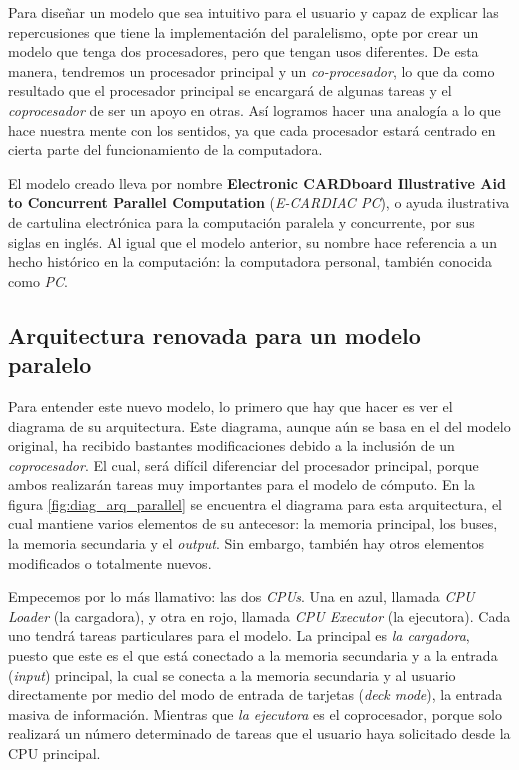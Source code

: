 \documentclass[letterpaper,12pt,oneside]{book}
\begin{document}
	 Para diseñar un modelo que sea intuitivo para el usuario y capaz de explicar las repercusiones que tiene
	 la implementación del paralelismo, opte por crear un modelo que tenga dos procesadores, pero que tengan
	 usos diferentes. De esta manera, tendremos un procesador principal y un \textit{co-procesador}, lo
	 que da como resultado que el procesador principal
	 se encargará de algunas tareas y el \textit{coprocesador} de ser un apoyo en otras. Así logramos
	 hacer una analogía a lo que hace nuestra mente con los sentidos, ya que cada procesador
	 estará centrado en cierta parte del funcionamiento de la computadora.
	 


	 El modelo creado lleva por nombre \textbf{Electronic CARDboard Illustrative Aid to
	 Concurrent Parallel Computation} (\textit{E-CARDIAC PC}), o ayuda ilustrativa de cartulina electrónica para la computación paralela y concurrente, 
	 por
	 sus siglas en inglés. Al igual que el modelo anterior, su nombre hace referencia a un hecho histórico en la computación: la computadora
	 personal, también conocida como \textit{PC}.
	 
	 	\subsection{Arquitectura renovada para un modelo paralelo}
	 	
	 	Para entender este nuevo modelo, lo primero que hay que hacer es ver el diagrama de su arquitectura. Este diagrama,
	 	aunque aún se basa en el del modelo original, ha recibido bastantes modificaciones debido a la inclusión de
	 	un \textit{coprocesador}. El cual, será difícil diferenciar del procesador principal, porque ambos realizarán tareas muy importantes
	 	para el modelo de cómputo. En la figura \ref{fig:diag_arq_parallel} se encuentra el diagrama para esta arquitectura, el cual mantiene 
	 	varios elementos de su antecesor: la 
	 	memoria principal, los buses, la memoria secundaria y el \textit{output}. Sin embargo, también hay otros elementos modificados o totalmente 
	 	nuevos. 
	 	
	 	Empecemos por lo más llamativo: las dos \textit{CPUs}. Una en azul, llamada \textit{CPU Loader} (la cargadora), y otra en rojo, llamada
	 	 \textit{CPU Executor} (la ejecutora).
	 	 Cada uno tendrá tareas
	 	particulares para el modelo. La principal es \textit{la cargadora}, puesto que este es el que está conectado a la memoria secundaria y a la
	 	entrada (\textit{input}) principal, la cual se conecta a la memoria secundaria y al usuario directamente por medio del modo de entrada de 
	 	tarjetas (\textit{deck mode}),
	 	la entrada masiva de información. Mientras que \textit{la ejecutora} es el coprocesador, porque solo realizará un número
	 	determinado de tareas que el usuario haya solicitado desde la CPU principal.
   
\end{document}
